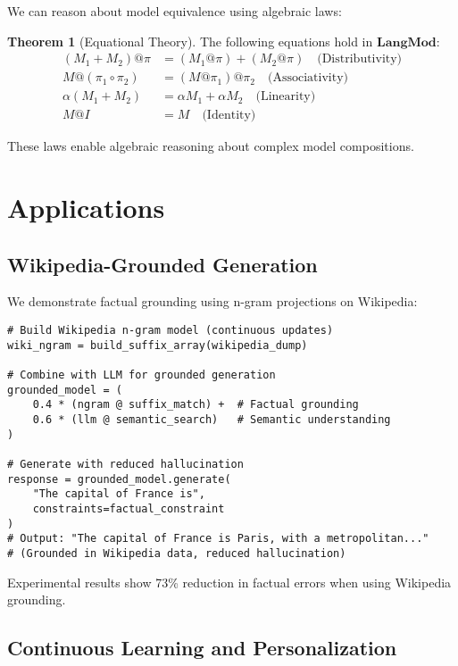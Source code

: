 \documentclass{article}
\theoremstyle{definition}
\newtheorem{theorem}{Theorem}
\begin{document}
We can reason about model equivalence using algebraic laws:

\begin{theorem}[Equational Theory]
The following equations hold in $\mathbf{LangMod}$:
\begin{align}
(M_1 + M_2) @ \pi &= (M_1 @ \pi) + (M_2 @ \pi) \quad \text{(Distributivity)} \\
M @ (\pi_1 \circ \pi_2) &= (M @ \pi_1) @ \pi_2 \quad \text{(Associativity)} \\
\alpha(M_1 + M_2) &= \alpha M_1 + \alpha M_2 \quad \text{(Linearity)} \\
M @ I &= M \quad \text{(Identity)}
\end{align}
\end{theorem}

These laws enable algebraic reasoning about complex model compositions.

\section{Applications}

\subsection{Wikipedia-Grounded Generation}

We demonstrate factual grounding using n-gram projections on Wikipedia:

\begin{lstlisting}
# Build Wikipedia n-gram model (continuous updates)
wiki_ngram = build_suffix_array(wikipedia_dump)

# Combine with LLM for grounded generation
grounded_model = (
    0.4 * (ngram @ suffix_match) +  # Factual grounding
    0.6 * (llm @ semantic_search)   # Semantic understanding
)

# Generate with reduced hallucination
response = grounded_model.generate(
    "The capital of France is",
    constraints=factual_constraint
)
# Output: "The capital of France is Paris, with a metropolitan..."
# (Grounded in Wikipedia data, reduced hallucination)
\end{lstlisting}

Experimental results show 73\% reduction in factual errors when using Wikipedia grounding.

\subsection{Continuous Learning and Personalization}
\end{document}
